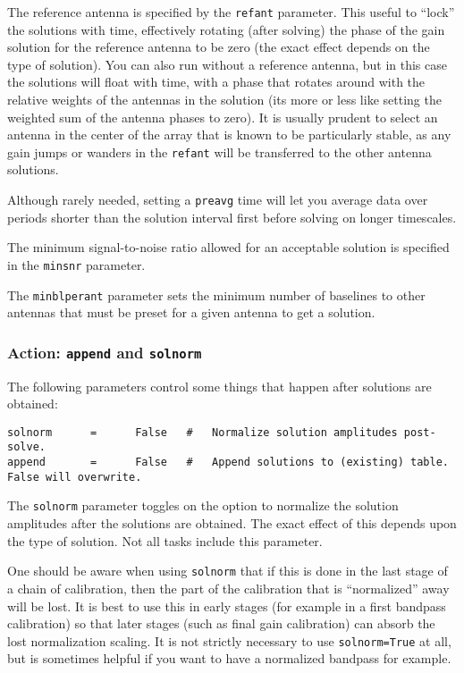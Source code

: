 The reference antenna is specified by the {\tt refant} parameter.
This useful to ``lock'' the solutions with time, effectively rotating
(after solving) the phase of the gain solution for the reference
antenna to be zero (the exact effect depends on the type of solution).
You can also run without a reference antenna, but in this case the
solutions will float with time, with a phase that rotates around with
the relative weights of the antennas in the solution (its more or less
like setting the weighted sum of the antenna phases to zero).  It is
usually prudent to select an antenna in the center of the array that
is known to be particularly stable, as any gain jumps or wanders in
the {\tt refant} will be transferred to the other antenna solutions.

Although rarely needed, setting a {\tt preavg} time will let you 
average data over periods shorter than the solution interval first
before solving on longer timescales.

The minimum signal-to-noise ratio allowed for an acceptable solution
is specified in the {\tt minsnr} parameter.  

The {\tt minblperant} parameter sets the minimum number of baselines
to other antennas that must be preset for a given antenna to get
a solution.

\subsubsection{Action: {\tt append} and {\tt solnorm} }
\label{section:cal.solve.pars.action}

The following parameters control some things that happen after
solutions are obtained:
\small
\begin{verbatim}
solnorm      =      False   #   Normalize solution amplitudes post-solve.
append       =      False   #   Append solutions to (existing) table.  False will overwrite.
\end{verbatim} 
\normalsize

The {\tt solnorm} parameter toggles on the option to normalize the
solution amplitudes after the solutions are obtained.  The exact
effect of this depends upon the type of solution.  Not all tasks
include this parameter.  

One should be aware when using {\tt solnorm} that if this is done
in the last stage of a chain of calibration, then the part of 
the calibration that is ``normalized'' away will be lost.  It is
best to use this in early stages (for example in a first bandpass
calibration) so that later stages (such as final gain calibration)
can absorb the lost normalization scaling.  It is not strictly
necessary to use {\tt solnorm=True} at all, but is sometimes helpful
if you want to have a normalized bandpass for example.

